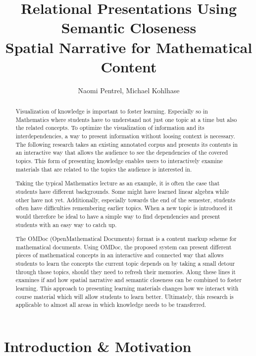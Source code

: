 \documentclass{llncs}
\title{Relational Presentations Using Semantic Closeness\\Spatial Narrative for
  Mathematical Content}
\author{Naomi Pentrel, Michael Kohlhase}
\institute{Jacobs University Bremen}
\begin{document}
\maketitle


 \begin{abstract}
Visualization of knowledge is important to foster learning. Especially so in Mathematics where students have to understand not just one topic at a time but also the related concepts. To optimize the visualization of information and its interdependencies, a way to present information without loosing context is necessary. The following research takes an existing annotated corpus and presents its contents in an interactive way that allows the audience to see the dependencies of the covered topics. This form of presenting knowledge enables users to interactively examine materials that are related to the topics the audience is interested in.

Taking the typical Mathematics lecture as an example, it is often the case that students have different backgrounds. Some might have learned linear algebra while other have not yet. Additionally, especially towards the end of the semester, students often have difficulties remembering earlier topics. When a new topic is introduced it would therefore be ideal to have a simple way to find dependencies and present students with an easy way to catch up.

The OMDoc (OpenMathematical Documents) format is a content markup scheme for mathematical documents. Using OMDoc, the proposed system can present different pieces of mathematical concepts in an interactive and connected way that allows students to learn the concepts the current topic depends on by taking a small detour through those topics, should they need to refresh their memories. Along these lines it examines if and how spatial narrative and semantic closeness can be combined to foster learning. This approach to presenting learning materials changes how we interact with course material which will allow students to learn better. Ultimately, this research is applicable to almost all areas in which knowledge needs to be transferred.
\end{abstract}

\section{Introduction \& Motivation}
\label{sec:introduction}
\end{document}
